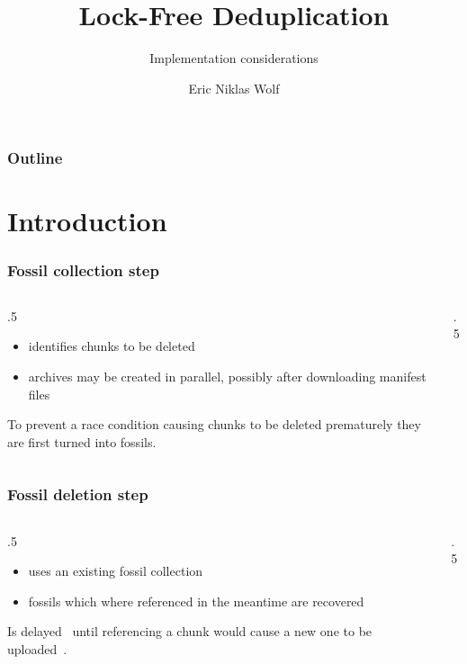 \documentclass[english,utf8,aspectratio=169]{beamer}
\title{Lock-Free Deduplication}
\subtitle{Implementation considerations}
\author{Eric Niklas Wolf}
\begin{document}
    \maketitle

    \begin{frame}
        \frametitle{Outline}
        \tableofcontents
    \end{frame}

    \section{Introduction}
    \begin{frame}
        \frametitle{Fossil collection step}
        \begin{columns}
            \begin{column}{.5\textwidth}
                \begin{itemize}
                    \item identifies chunks to be deleted
                    \item archives may be created in parallel, possibly after
                        downloading manifest files
                \end{itemize}
                To prevent a race condition causing chunks to be deleted prematurely they
                are first turned into fossils.
            \end{column}
            \begin{column}{.5\textwidth}
                
            \end{column}
        \end{columns}
    \end{frame}

    \begin{frame}
        \frametitle{Fossil deletion step}
        \begin{columns}
            \begin{column}{.5\textwidth}
                \begin{itemize}
                    \item uses an existing fossil collection
                    \item fossils which where referenced in the meantime are recovered
                \end{itemize}
                Is delayed~\cite[Policy 3]{Duplicacy} until referencing a chunk would cause a new
                one to be uploaded~\cite[Policy 2]{Duplicacy}.
            \end{column}
            \begin{column}{.5\textwidth}
                
            \end{column}
        \end{columns}
    \end{frame}
\end{document}

